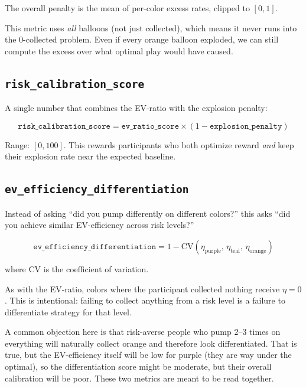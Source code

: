 \documentclass[11pt,a4paper]{article}
\begin{document}
The overall penalty is the mean of per-color excess rates, clipped to $[0, 1]$.

This metric uses \emph{all} balloons (not just collected), which means it
never runs into the 0-collected problem. Even if every orange balloon
exploded, we can still compute the excess over what optimal play would
have caused.


\subsection{\texttt{risk\_calibration\_score}}

A single number that combines the EV-ratio with the explosion penalty:

\begin{equation}
    \texttt{risk\_calibration\_score} = \texttt{ev\_ratio\_score} \times
        (1 - \texttt{explosion\_penalty})
\end{equation}

Range: $[0, 100]$. This rewards participants who both optimize reward
\emph{and} keep their explosion rate near the expected baseline.


\subsection{\texttt{ev\_efficiency\_differentiation}}
\label{sec:ev_diff}

Instead of asking ``did you pump differently on different colors?'' this
asks ``did you achieve similar EV-efficiency across risk levels?''

\begin{equation}
    \texttt{ev\_efficiency\_differentiation} = 1 - \text{CV}(\eta_{\text{purple}},\,
        \eta_{\text{teal}},\, \eta_{\text{orange}})
\end{equation}

where $\text{CV}$ is the coefficient of variation.

As with the EV-ratio, colors where the participant collected nothing receive
$\eta = 0$. This is intentional: failing to collect anything from a risk
level is a failure to differentiate strategy for that level.

A common objection here is that risk-averse people who pump 2--3 times on
everything will naturally collect orange and therefore look differentiated.
That is true, but the EV-efficiency itself will be low for purple (they are
way under the optimal), so the differentiation score might be moderate,
but their overall calibration will be poor. These two metrics are meant to
be read together.
\end{document}
